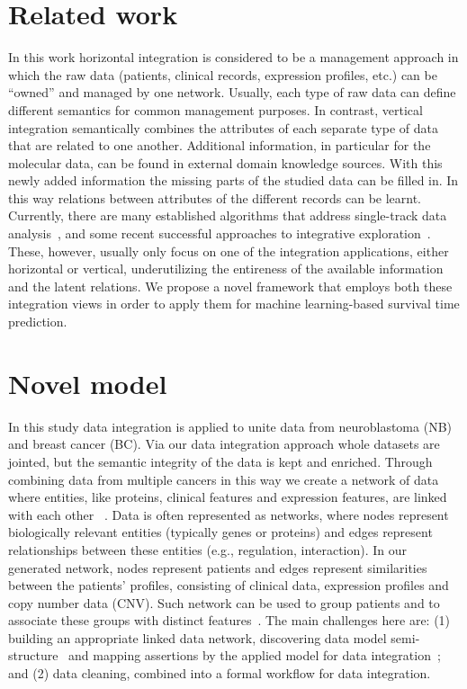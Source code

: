 \documentclass{bmcart}
\begin{document}
\section{Related work}

In this work horizontal integration is considered to be a management
approach in which the raw data (patients, clinical records, expression
profiles, etc.) can be {\textquotedblleft}owned{\textquotedblright} and
managed by one network. Usually, each type of raw data can define
different semantics for common management purposes. In contrast,
vertical integration semantically combines the attributes of each
separate type of data that are related to one another. Additional
information, in particular for the molecular data, can be found in
external domain knowledge sources. With this newly added information
the missing parts of the studied data can be filled in. In this way
relations between attributes of the different records can be learnt.
Currently, there are many established algorithms that address
single-track data analysis~\cite{25, 26, 30, 33}, and some recent successful
approaches to integrative exploration~\cite{31}. These, however, usually
only focus on one of the integration applications, either horizontal or
vertical, underutilizing the entireness of the available information
and the latent relations. We propose a novel framework that employs
both these integration views in order to apply them for machine
learning-based survival time prediction. 

\section{Novel model}

In this study data integration is applied to unite data from
neuroblastoma (NB) and breast cancer (BC). Via our data integration
approach whole datasets are jointed, but the semantic integrity of the
data is kept and enriched. Through combining data from multiple cancers
in this way we create a network of data where entities, like proteins,
clinical features and expression features, are linked with each other~\cite{9}
. Data is often represented as networks, where nodes represent
biologically relevant entities (typically genes or proteins) and edges
represent relationships between these entities (e.g., regulation,
interaction). In our generated network, nodes represent patients and
edges represent similarities between the patients{\textquoteright}
profiles, consisting of clinical data, expression profiles and copy
number data (CNV). Such network can be used to group patients and to
associate these groups with distinct features~\cite{4}. The main challenges
here are: (1) building an appropriate linked data network, discovering
data model semi-structure~\cite{5} and mapping assertions by the applied
model for data integration~\cite{6}; and (2) data cleaning, combined into a
formal workflow for data integration. 
\end{document}
